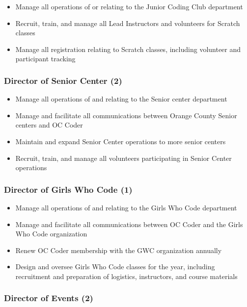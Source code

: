 \documentclass[twoside,11pt,letterpaper,abstracton]{scrartcl}
\begin{document}
\begin{itemize}
    \item Manage all operations of or relating to the Junior Coding Club department
    \item Recruit, train, and manage all Lead Instructors and volunteers for Scratch classes
    \item Manage all registration relating to Scratch classes, including volunteer and participant tracking
\end{itemize}

\subsubsection{Director of Senior Center (2)}

\begin{itemize}
    \item Manage all operations of and relating to the Senior center department
    \item Manage and facilitate all communications between Orange County Senior centers and OC Coder
    \item Maintain and expand Senior Center operations to more senior centers
    \item Recruit, train, and manage all volunteers participating in Senior Center operations
\end{itemize}

\subsubsection{Director of Girls Who Code (1)}

\begin{itemize}
    \item Manage all operations of and relating to the Girls Who Code department
    \item Manage and facilitate all communications between OC Coder and the Girls Who Code organization
    \item Renew OC Coder membership with the GWC organization annually
    \item Design and oversee Girls Who Code classes for the year, including recruitment and preparation of logistics, instructors, and course materials
\end{itemize}

\subsubsection{Director of Events (2)}
\end{document}
